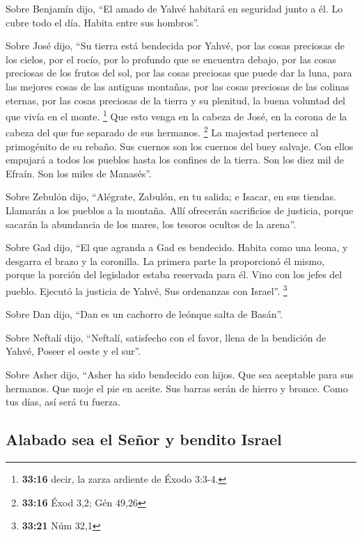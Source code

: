 \begin{paracol}{2}
 Sobre Benjamín dijo, ``El amado de Yahvé habitará en
seguridad junto a él. Lo cubre todo el día. Habita entre sus hombros''.

 Sobre José dijo, ``Su tierra está bendecida por Yahvé,
por las cosas preciosas de los cielos, por el rocío, por lo profundo que
se encuentra debajo,  por las cosas preciosas de los
frutos del sol, por las cosas preciosas que puede dar la luna,
 para las mejores cosas de las antiguas montañas, por las
cosas preciosas de las colinas eternas,  por las cosas
preciosas de la tierra y su plenitud, la buena voluntad del que vivía en
el monte. \footnote{\textbf{33:16} decir, la zarza ardiente de Éxodo
  3:3-4.} Que esto venga en la cabeza de José, en la corona de la cabeza
del que fue separado de sus hermanos. \footnote{\textbf{33:16} Éxod 3,2;
  Gén 49,26}  La majestad pertenece al primogénito de su
rebaño. Sus cuernos son los cuernos del buey salvaje. Con ellos empujará
a todos los pueblos hasta los confines de la tierra. Son los diez mil de
Efraín. Son los miles de Manasés''.

 Sobre Zebulón dijo, ``Alégrate, Zabulón, en tu salida; e
Isacar, en sus tiendas.  Llamarán a los pueblos a la
montaña. Allí ofrecerán sacrificios de justicia, porque sacarán la
abundancia de los mares, los tesoros ocultos de la arena''.

 Sobre Gad dijo, ``El que agranda a Gad es bendecido.
Habita como una leona, y desgarra el brazo y la coronilla.
 La primera parte la proporcionó él mismo, porque la
porción del legislador estaba reservada para él. Vino con los jefes del
pueblo. Ejecutó la justicia de Yahvé, Sus ordenanzas con Israel''.
\footnote{\textbf{33:21} Núm 32,1}

 Sobre Dan dijo, ``Dan es un cachorro de leónque salta de
Basán''.

 Sobre Neftalí dijo, ``Neftalí, satisfecho con el favor,
llena de la bendición de Yahvé, Poseer el oeste y el sur''.

 Sobre Asher dijo, ``Asher ha sido bendecido con hijos.
Que sea aceptable para sus hermanos. Que moje el pie en aceite.
 Sus barras serán de hierro y bronce. Como tus días, así
será tu fuerza.

\hypertarget{alabado-sea-el-seuxf1or-y-bendito-israel}{%
\subsection{Alabado sea el Señor y bendito
Israel}\label{alabado-sea-el-seuxf1or-y-bendito-israel}}


\end{paracol}
